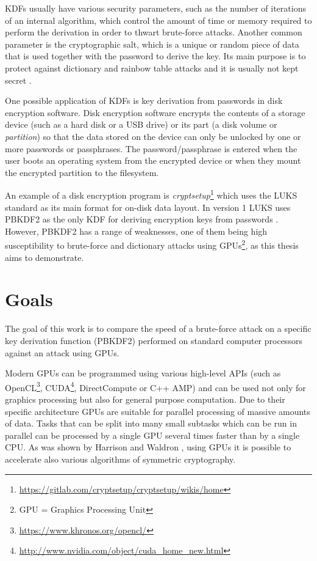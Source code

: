 \documentclass[12pt,oneside]{fithesis2}
\begin{document}
      KDFs usually have various security parameters, such as the number of iterations of an internal algorithm, which control the amount of time or memory required to perform the derivation in order to thwart brute-force attacks. Another common parameter is the cryptographic salt, which is a unique or random piece of data that is used together with the password to derive the key. Its main purpose is to protect against dictionary and rainbow table attacks and it is usually not kept secret \cite[section 4.1]{rfc2898}.
      
      \sloppy
      One possible application of KDFs is key derivation from passwords in disk encryption software. Disk encryption software encrypts the contents of a storage device (such as a hard disk or a USB drive) or its part (a disk volume or \emph{partition}) so that the data stored on the device can only be unlocked by one or more passwords or passphrases. The password/passphrase is entered when the user boots an operating system from the encrypted device or when they mount the encrypted partition to the filesystem.
      
      An example of a disk encryption program is \emph{cryptsetup}\footnote{\url{https://gitlab.com/cryptsetup/cryptsetup/wikis/home}} which uses the LUKS standard as its main format for on-disk data layout. In version 1 LUKS uses PBKDF2 as the only KDF for deriving encryption keys from passwords \cite{luks}. However, PBKDF2 has a range of weaknesses, one of them being high susceptibility to brute-force and dictionary attacks using GPUs\footnote{GPU = Graphics Processing Unit}, as this thesis aims to demonstrate.
    
      \section{Goals}
      The goal of this work is to compare the speed of a brute-force attack on a specific key derivation function (PBKDF2) performed on standard computer processors against an attack using GPUs.
      
      Modern GPUs can be programmed using various high-level APIs (such as OpenCL\footnote{\url{https://www.khronos.org/opencl/}}, CUDA\footnote{\url{http://www.nvidia.com/object/cuda_home_new.html}}, DirectCompute or C++ AMP) and can be used not only for graphics processing but also for general purpose computation. Due to their specific architecture GPUs are suitable for parallel processing of massive amounts of data. Tasks that can be split into many small subtasks which can be run in parallel can be processed by a single GPU several times faster than by a single CPU. As was shown by Harrison and Waldron \cite{Harrison}, using GPUs it is possible to accelerate also various algorithms of symmetric cryptography.
    
\end{document}
